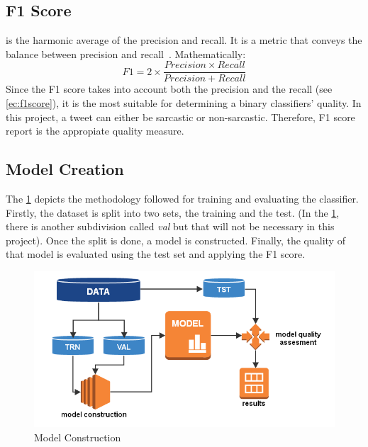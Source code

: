 \subsection{F1 Score}
is the harmonic average of the precision and recall. It is a metric that conveys the balance between precision and recall~\cite{f1score}. Mathematically:
\begin{equation}
	F1 = 2\times \frac{Precision \times Recall}{Precision + Recall}
	\label{ec:f1score}
\end{equation}
Since the F1 score takes into account both the precision and the recall (see \cref{ec:f1score}), it is the most suitable for determining a binary classifiers' quality. In this project, a tweet can either be sarcastic or non-sarcastic. Therefore, F1 score report is the appropiate quality measure.
\subsection{Model Creation}
\label{sec:modcons}
The \cref{fig:modcons} depicts the methodology followed for training and evaluating the classifier. Firstly, the dataset is split into two sets, the training and the test. (In the \cref{fig:modcons}, there is another subdivision called \textit{val} but that will not be necessary in this project). Once the split is done, a model is constructed. Finally, the quality of that model is evaluated using the test set and applying the F1 score.
\begin{figure}
	\includegraphics[width=\linewidth]{img/model_construction.png}
	\caption{Model Construction~\cite{modcons}}
	\label{fig:modcons}
\end{figure}





